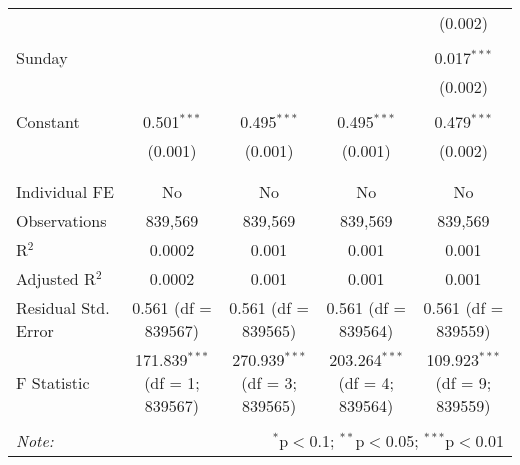 \documentclass[
]{article}
\begin{document}
\begin{table}[!htbp]
{\begin{tabular}{@{\extracolsep{5pt}}lcccc}
  &  &  &  & (0.002) \\ 
  & & & & \\ 
 Sunday &  &  &  & 0.017$^{***}$ \\ 
  &  &  &  & (0.002) \\ 
  & & & & \\ 
 Constant & 0.501$^{***}$ & 0.495$^{***}$ & 0.495$^{***}$ & 0.479$^{***}$ \\ 
  & (0.001) & (0.001) & (0.001) & (0.002) \\ 
  & & & & \\ 
\hline \\[-1.8ex] 
Individual FE & No & No & No & No \\ 
Observations & 839,569 & 839,569 & 839,569 & 839,569 \\ 
R$^{2}$ & 0.0002 & 0.001 & 0.001 & 0.001 \\ 
Adjusted R$^{2}$ & 0.0002 & 0.001 & 0.001 & 0.001 \\ 
Residual Std. Error & 0.561 (df = 839567) & 0.561 (df = 839565) & 0.561 (df = 839564) & 0.561 (df = 839559) \\ 
F Statistic & 171.839$^{***}$ (df = 1; 839567) & 270.939$^{***}$ (df = 3; 839565) & 203.264$^{***}$ (df = 4; 839564) & 109.923$^{***}$ (df = 9; 839559) \\ 
\hline 
\hline \\[-1.8ex] 
\textit{Note:}  & \multicolumn{4}{r}{$^{*}$p$<$0.1; $^{**}$p$<$0.05; $^{***}$p$<$0.01} \\ 
\end{tabular}
} 
\end{table} 
\newpage
\end{document}
